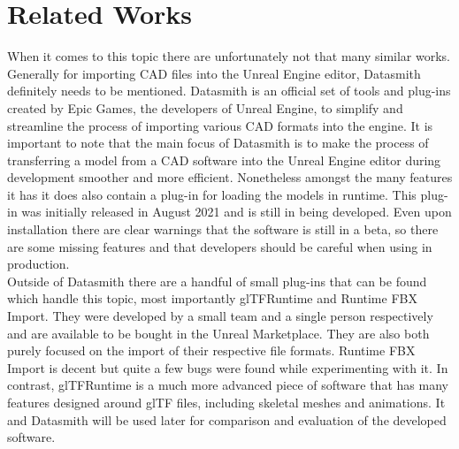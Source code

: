 \section{Related Works}

When it comes to this topic there are unfortunately not that many similar works. Generally for importing \acs{CAD} files into the Unreal Engine editor, Datasmith definitely needs to be mentioned. Datasmith is an official set of tools and plug-ins created by Epic Games, the developers of Unreal Engine, to simplify and streamline the process of importing various \acs{CAD} formats into the engine\cite{bib:DSDoc}. It is important to note that the main focus of Datasmith is to make the process of transferring a model from a \acs{CAD} software into the Unreal Engine editor during development smoother and more efficient. Nonetheless amongst the many features it has it does also contain a plug-in for loading the models in runtime\cite{bib:DSRunDoc}. This plug-in was initially released in August 2021 and is still in being developed. Even upon installation there are clear warnings that the software is still in a beta, so there are some missing features and that developers should be careful when using in production.\\
Outside of Datasmith there are a handful of small plug-ins that can be found which handle this topic, most importantly glTFRuntime\cite{bib:glTFRun} and Runtime FBX Import\cite{bib:FBXRun}. They were developed by a small team and a single person respectively and are available to be bought in the Unreal Marketplace. They are also both purely focused on the import of their respective file formats. Runtime \acs{FBX} Import is decent but quite a few bugs were found while experimenting with it. In contrast, glTFRuntime is a much more advanced piece of software that has many features designed around \acs{glTF} files, including skeletal meshes and animations. It and Datasmith will be used later for comparison and evaluation of the developed software.